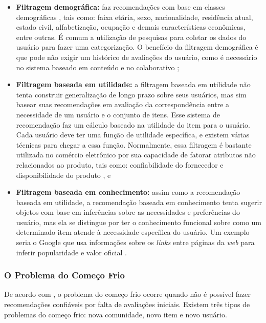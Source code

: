 \begin{itemize}

    \item \textbf{Filtragem demográfica: }faz recomendações com base em classes demográficas \cite{burke2002}, tais 
	como: faixa etária, sexo, nacionalidade, residência atual, estado civil, 
	alfabetização, ocupação e demais características econômicas, entre outras. É comum a utilização de pesquisas para 
	coletar os  dados do usuário para fazer uma categorização. O benefício da filtragem demográfica é que
	pode não exigir um histórico de avaliações do usuário, como é necessário no sistema baseado em conteúdo e no colaborativo \cite{burke2002};
    \item \textbf{Filtragem baseada em utilidade: }a filtragem baseada em utilidade não tenta construir generalização de longo prazo sobre seus usuários, mas sim basear suas recomendações 
	em avaliação da correspondência entre a necessidade de um usuário e o conjunto de itens.
	Esse sistema de recomendação faz um cálculo baseado na utilidade do item para o usuário.
	Cada usuário deve ter uma função de utilidade específica, e existem várias técnicas para chegar a essa função. Normalmente, 
	essa filtragem é bastante utilizada no comércio eletrônico por sua capacidade de fatorar atributos não 
	relacionados ao produto, tais como:
	confiabilidade do fornecedor e disponibilidade do produto \cite{burke2002}, e
    \item \textbf{Filtragem baseada em conhecimento: }
	assim como a recomendação baseada em utilidade, a recomendação baseada em conhecimento tenta sugerir objetos com base em inferências
	sobre as necessidades e preferências do usuário, mas ela se distingue por ter o conhecimento funcional sobre 
	como um determinado item atende à necessidade específica do usuário. Um exemplo seria 
	o Google que usa informações sobre os \emph{links} entre páginas da \emph{web} para inferir popularidade e valor oficial \cite{burke2002}.
\end{itemize}

\subsubsection{O Problema do Começo Frio}

De acordo com , o problema do começo frio ocorre quando não é possível fazer recomendações 
confiáveis por falta de avaliações iniciais. Existem três tipos de problemas do começo frio: nova comunidade, novo item e novo usuário. 

